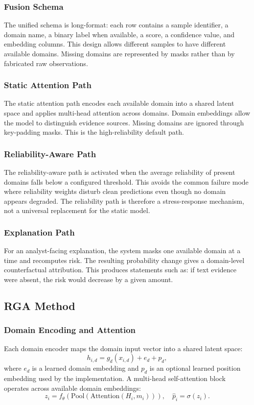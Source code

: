 \documentclass[10pt,conference]{IEEEtran}
\newcommand{\method}{RGA}
\begin{document}
\subsubsection{Fusion Schema}
The unified schema is long-format: each row contains a sample identifier, a
domain name, a binary label when available, a score, a confidence value, and
embedding columns. This design allows different samples to have different
available domains. Missing domains are represented by masks rather than by
fabricated raw observations.

\subsubsection{Static Attention Path}
The static attention path encodes each available domain into a shared latent
space and applies multi-head attention across domains. Domain embeddings allow
the model to distinguish evidence sources. Missing domains are ignored through
key-padding masks. This is the high-reliability default path.

\subsubsection{Reliability-Aware Path}
The reliability-aware path is activated when the average reliability of present
domains falls below a configured threshold. This avoids the common failure mode
where reliability weights disturb clean predictions even though no domain
appears degraded. The reliability path is therefore a stress-response mechanism,
not a universal replacement for the static model.

\subsubsection{Explanation Path}
For an analyst-facing explanation, the system masks one available domain at a
time and recomputes risk. The resulting probability change gives a domain-level
counterfactual attribution. This produces statements such as: if text evidence
were absent, the risk would decrease by a given amount.

\subsection{\method{} Method}
\subsubsection{Domain Encoding and Attention}
Each domain encoder maps the domain input vector into a shared latent space:
\begin{equation}
  h_{i,d} = g_d(x_{i,d}) + e_d + p_d,
\end{equation}
where $e_d$ is a learned domain embedding and $p_d$ is an optional learned
position embedding used by the implementation. A multi-head self-attention
block operates across available domain embeddings:
\begin{equation}
  z_i = f_{\theta}(\mathrm{Pool}(\mathrm{Attention}(H_i,m_i))),
  \quad
  \hat{p}_i = \sigma(z_i).
\end{equation}
\end{document}
